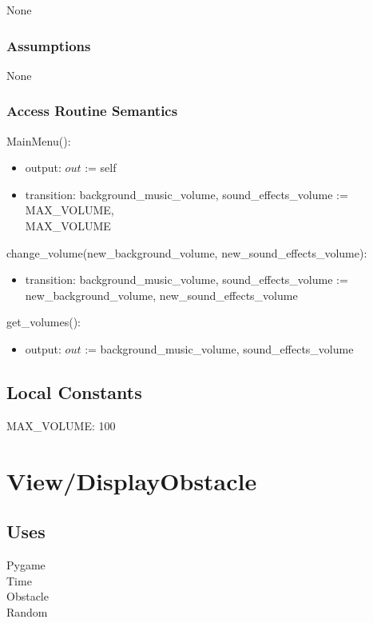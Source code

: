 \documentclass[12pt]{article}
\begin{document}
None

\subsubsection* {Assumptions}

None

\subsubsection* {Access Routine Semantics}

MainMenu():
\begin{itemize}
    \item output: $out$ := self
    \item transition: background\_music\_volume, sound\_effects\_volume := MAX\_VOLUME, \\ MAX\_VOLUME
\end{itemize}
\noindent change\_volume(new\_background\_volume, new\_sound\_effects\_volume):
\begin{itemize}
    \item transition: background\_music\_volume, sound\_effects\_volume := new\_background\_volume, new\_sound\_effects\_volume
\end{itemize}
\noindent get\_volumes():
\begin{itemize}
    \item output: $out$ := background\_music\_volume, sound\_effects\_volume 
\end{itemize}
\subsection* {Local Constants}
MAX\_VOLUME: 100

\newpage

\section*{View/DisplayObstacle}

\subsection* {Uses}

Pygame\\
Time\\
Obstacle\\
Random
\end{document}
